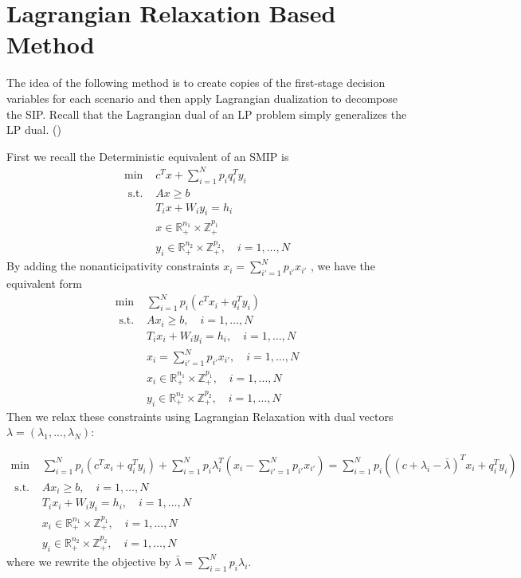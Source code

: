 \documentclass{article}
\theoremstyle{plain}
\theoremstyle{definition}
\begin{document}
\section{Lagrangian Relaxation Based Method}
The idea of the following method is to create copies of the first-stage decision variables for each scenario and then apply Lagrangian dualization to decompose the SIP. Recall that the Lagrangian dual of an LP problem simply generalizes the LP dual. (\cite{Lagrangian Relaxation})

First we recall the Deterministic equivalent of an SMIP is 
\begin{equation}
\begin{array}{ll}
\min & c^{T} x+\sum_{i=1}^{N} p_{i} q_{i}^{T} y_{i} \\
\text { s.t. } & A x \geq b \\
& T_{i} x+W_{i} y_{i}=h_{i} \\
& x \in \mathbb{R}_{+}^{n_{1}} \times \mathbb{Z}_{+}^{p_{1}} \\
& y_{i} \in \mathbb{R}_{+}^{n_{2}} \times \mathbb{Z}_{+}^{p_{2}}, \quad i=1, \ldots, N
\end{array}
\end{equation}
By adding the nonanticipativity constraints $x_i =\sum_{i'=1}^{N} p_{i'}x_{i'}$ , we have the equivalent form
\begin{equation}
\begin{array}{ll}
\min & \sum_{i=1}^{N} p_{i} (c^T x_i + q_{i}^{T} y_{i}) \\
\text { s.t. } & A x_i \geq b, \quad i=1, \ldots, N \\
& T_{i} x_i+W_{i} y_{i}=h_{i},  \quad i=1, \ldots, N \\
& x_i =\sum_{i'=1}^{N} p_{i'}x_{i'}, \quad i=1, \ldots, N \\
& x_{i} \in \mathbb{R}_{+}^{n_{1}} \times \mathbb{Z}_{+}^{p_{1}}, \quad i=1, \ldots, N \\
& y_{i} \in \mathbb{R}_{+}^{n_{2}} \times \mathbb{Z}_{+}^{p_{2}}, \quad i=1, \ldots, N
\end{array}
\end{equation}
Then we relax these constraints using Lagrangian Relaxation with dual vectors $\lambda = (\lambda_1, . . . , \lambda_N )$:

\begin{equation}
\begin{array}{ll}
\min & \sum_{i=1}^{N} p_{i} (c^T x_i + q_{i}^{T} y_{i}) + \sum_{i=1}^{N}p_i\lambda_{i}^{T}(x_i -\sum_{i'=1}^{N} p_{i'}x_{i'})=\sum_{i=1}^{N} p_{i} ((c+\lambda_i - \bar{\lambda})^T x_i + q_{i}^{T} y_{i})\\
\text { s.t. } & A x_i \geq b, \quad i=1, \ldots, N \\
& T_{i} x_i+W_{i} y_{i}=h_{i},  \quad i=1, \ldots, N \\
& x_{i} \in \mathbb{R}_{+}^{n_{1}} \times \mathbb{Z}_{+}^{p_{1}}, \quad i=1, \ldots, N \\
& y_{i} \in \mathbb{R}_{+}^{n_{2}} \times \mathbb{Z}_{+}^{p_{2}}, \quad i=1, \ldots, N
\end{array}
\end{equation}
where we rewrite the objective by $\bar{\lambda}=\sum_{i=1}^{N} p_i \lambda_i$. 
\end{document}
